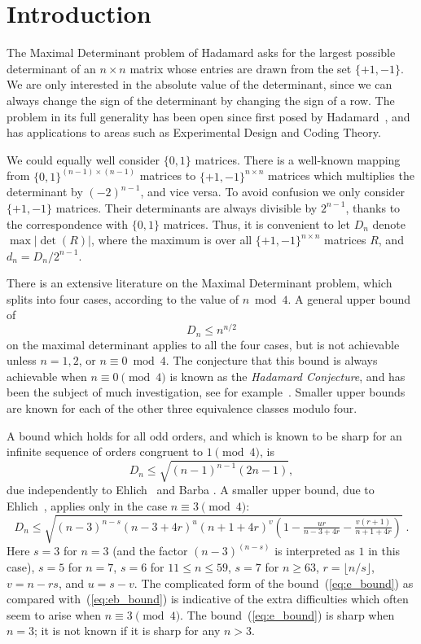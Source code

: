 \documentclass[11pt,a4paper]{article}
\newcommand{\be}{\begin{equation}}
\newcommand{\ee}{\end{equation}}
\begin{document}
\section{Introduction} 
The Maximal Determinant problem of Hadamard \cite{Hadamard93,maxdet}
asks for the largest possible determinant of an $n \times n$ matrix whose
entries are drawn from the set $\{+1,-1\}$.
We are only interested in the absolute value of the determinant, since we
can always change the sign of the determinant by changing the sign of a row.  
The problem in its full generality has been open since first posed by
Hadamard~\cite{Hadamard93}, and has applications to areas such as
Experimental Design and Coding Theory.

We could equally well consider $\{0,1\}$ matrices. There is a well-known
mapping~\cite{Osborn02} from $\{0,1\}^{(n-1)\times (n-1)}$ matrices to
$\{+1,-1\}^{n \times n}$ matrices 
which multiplies the determinant by $(-2)^{n-1}$, and 
vice versa. To avoid confusion we only consider $\{+1,-1\}$ matrices.
Their determinants are always divisible by $2^{n-1}$,
thanks to the correspondence with $\{0,1\}$ matrices.
Thus, it is convenient to let $D_n$ denote $\max |\det(R)|$,
where the maximum is over all $\{+1,-1\}^{n \times n}$ matrices $R$,
and $d_n = D_n/2^{n-1}$.

There is an extensive literature on the Maximal Determinant problem, which
splits into four cases, according to the value of $n \bmod 4$.  A general
upper bound of
\be \label{eq:Hadamard} 
D_n \le n^{n/2}
\ee
on the maximal determinant applies to all the four
cases, but is not achievable unless
$n = 1, 2$, or $n \equiv 0 \bmod 4$.
The conjecture that this bound is always achievable
when $n \equiv 0 \pmod 4$ is
known as the \emph{Hadamard Conjecture}, and has been the subject of much
investigation, see for example~\cite{GeSe79,Horadam07}.  
Smaller upper bounds are known for each of the other three equivalence
classes modulo four.

A bound which holds for all odd orders, and which is known to be
sharp for an infinite sequence of orders congruent to $1 \pmod 4$, 
is 
\be \label{eq:eb_bound}
D_n \le \sqrt{(n-1)^{n-1}(2n-1)},
\ee
due independently to Ehlich~\cite{Ehlich64a} 
and Barba \cite{Bar33}.
A smaller upper bound, due to Ehlich~\cite{Ehlich64b}, 
applies only in the case $n \equiv 3 \pmod 4$:
\be \label{eq:e_bound} %
D_n \le \sqrt{(n-3)^{n-s}(n-3+4r)^{u}(n+1+4r)^{v}
\left(1 - \tfrac{ur}{n-3+4r} - \tfrac{v(r+1)}{n+1+4r}\right)}\;.
\ee
Here $s=3$ for $n=3$ (and the factor $(n-3)^{(n-s)}$ is interpreted
as $1$ in this case), 
$s=5$ for $n=7$, 
$s=6$ for $11 \le n \le 59$, 
$s=7$ for $n \ge 63$,
$r = \lfloor n/s \rfloor$, $v = n - rs$,  and $u = s - v$.
The complicated form of the bound~(\ref{eq:e_bound})
as compared with~(\ref{eq:eb_bound}) is indicative of the extra
difficulties which often seem to arise when $n \equiv 3 \pmod 4$.  The
bound~(\ref{eq:e_bound}) is sharp when $n=3$; it is not known if 
it is sharp for any $n > 3$.
\end{document}
